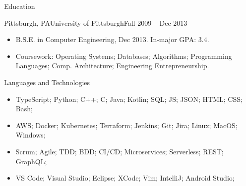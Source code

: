 \documentclass[]{mussocv}
\begin{document}
	\begin{cvsection}{Education}
		\begin{cvsubsection}{Pittsburgh, PA}{University of Pittsburgh}{Fall 2009 -- Dec 2013}
			\begin{itemize}
				\item B.S.E. in Computer Engineering, Dec 2013.  In-major GPA: 3.4.
				\item Coursework: Operating Systems; Databases; Algorithms; Programming Languages; Comp. Architecture; Engineering Entrepreneurship.
			\end{itemize}
		\end{cvsubsection}
	\end{cvsection}
	
	\begin{cvsection}{Languages and Technologies}
		\begin{cvsubsection}{}{}{}	
			\begin{itemize}
				\item TypeScript; Python; C++; C; Java; Kotlin; SQL; JS; JSON; HTML; CSS; Bash;
				\item AWS; Docker; Kubernetes; Terraform; Jenkins; Git; Jira; Linux; MacOS; Windows;
				\item Scrum; Agile; TDD; BDD; CI/CD; Microservices; Serverless; REST; GraphQL;
				\item VS Code; Visual Studio; Eclipse; XCode; Vim; IntelliJ; Android Studio;
			\end{itemize}
		\end{cvsubsection}
	\end{cvsection}
	
\end{document}

